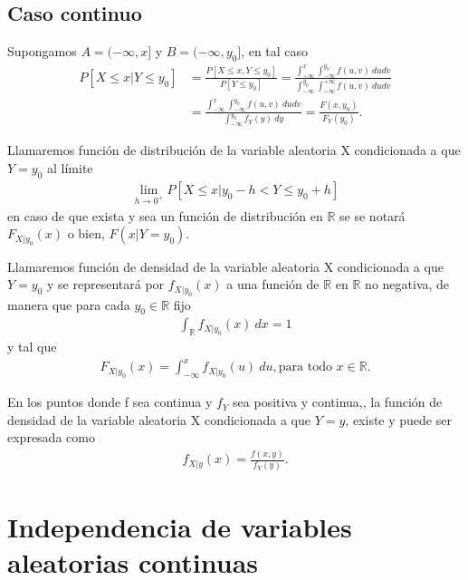 \subsection{Caso continuo}
Supongamos $A = (-\infty,x]$ y $B = (-\infty,y_0]$, en tal caso
\begin{align*}
    P[X \leq x | Y \leq y_0] &= \frac{P[X \leq x , Y \leq y_0] }{P[Y \leq y_0]} = \frac{\int_{-\infty}^{x}{\int_{-\infty}^{y_0}{f(u,v) \ dudv}}}{\int_{-\infty}^{y_0}\int_{-\infty}^{+\infty}{f(u,v) \ dudv}} \\
    &= \frac{\int_{-\infty}^{x}{\int_{-\infty}^{y_0}{f(u,v) \ dudv}}}{\int_{-\infty}^{y_0}{f_Y(y) \ dy}} = \frac{F(x,y_0)}{F_Y(y_0)}.
\end{align*}

\begin{defi}
Llamaremos función de distribución de la variable aleatoria X condicionada a que $Y = y_0$ al límite
\begin{align*}
    \lim_{h \to 0^+}{P[X \leq x | y_0 - h < Y \leq y_0 + h]}
\end{align*}
en caso de que exista y sea un función de distribución en $\mathbb{R}$ se se notará $F_{X | y_0}(x)$ o bien, $F(x | Y = y_0)$.
\end{defi}

\begin{defi}
Llamaremos función de densidad de la variable aleatoria X condicionada a que $Y = y_0$ y se representará por $f_{X | y_0}(x)$ a una función de $\mathbb{R}$ en $\mathbb{R}$ no negativa, de manera que para cada $y_0 \in \mathbb{R}$ fijo
\begin{align*}
    \int_{\mathbb{R}}{f_{X | y_0}(x) \ dx} = 1
\end{align*}
y tal que
\begin{align*}
    F_{X | y_0}(x) = \int_{-\infty}^{x}{f_{X | y_0}(u) \ du}, \text{para todo } x \in \mathbb{R}.
\end{align*}
\end{defi}

\begin{prop}
En los puntos donde f sea continua y $f_Y$ sea positiva y continua,, la función de densidad de la variable aleatoria X condicionada a que $Y = y$, existe y puede ser expresada como
\begin{align*}
    f_{X | y}(x) = \frac{f(x,y)}{f_Y(y)}.
\end{align*}
\end{prop}

\section{Independencia de variables aleatorias continuas}

